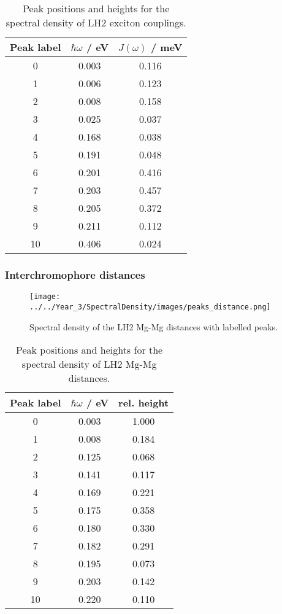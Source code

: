 \begin{table}
    \centering
    \begin{tabular}{||c c c||}
    \hline
    Peak label & $\hbar \omega$ / eV & $J\left(\omega\right)$ / meV \\
    \hline\hline
    
     0 & 0.003 & 0.116 \\
     1 & 0.006 & 0.123 \\
     2 & 0.008 & 0.158 \\
     3 & 0.025 & 0.037 \\
     4 & 0.168 & 0.038 \\
     5 & 0.191 & 0.048 \\
     6 & 0.201 & 0.416 \\
     7 & 0.203 & 0.457 \\
     8 & 0.205 & 0.372 \\
     9 & 0.211 & 0.112 \\
     10 & 0.406 & 0.024 \\
    \hline 
    \end{tabular}
    \caption{Peak positions and heights for the spectral density of LH2 exciton couplings.}
    \label{tab:couplings_lablled_peaks}
\end{table}

\afterpartskip
\subsubsection{Interchromophore distances}
\label{subsubsec:specdens_distances}

\begin{figure}
    \centering
    \texttt{[image: ../../Year\_3/SpectralDensity/images/peaks\_distance.png]}
    \caption{Spectral density of the LH2 Mg-Mg distances with labelled peaks.}
    \label{fig:distances_lablled_peaks}
\end{figure}


\begin{table}
    \centering
    \begin{tabular}{||c c c||}
    \hline
    Peak label & $\hbar \omega$ / eV & rel. height \\
    \hline\hline
    
     0 & 0.003 & 1.000 \\
     1 & 0.008 & 0.184 \\
     2 & 0.125 & 0.068 \\
     3 & 0.141 & 0.117 \\
     4 & 0.169 & 0.221 \\
     5 & 0.175 & 0.358 \\
     6 & 0.180 & 0.330 \\
     7 & 0.182 & 0.291 \\
     8 & 0.195 & 0.073 \\
     9 & 0.203 & 0.142 \\
     10 & 0.220 & 0.110 \\
    \hline 
    \end{tabular}
    \caption{Peak positions and heights for the spectral density of LH2 Mg-Mg distances.}
    \label{tab:distances_lablled_peaks}
\end{table}

